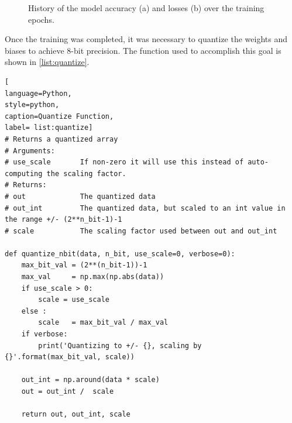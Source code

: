 \documentclass[11pt]{report}
\begin{document}
\begin{figure}[!ht]
     \centering
    \hfil

     \caption{History of the model accuracy (a) and losses (b) over the training epochs.}
    \label{fig:accuracy_over_epoch}
\end{figure}

Once the training was completed, it was necessary to quantize the weights and biases to achieve 8-bit precision. The function used to accomplish this goal is shown in \ref{list:quantize}.

\begin{lstlisting}[
language=Python,
style=python,
caption=Quantize Function,
label= list:quantize]
# Returns a quantized array
# Arguments:
# use_scale       If non-zero it will use this instead of auto-computing the scaling factor.
# Returns:
# out             The quantized data
# out_int         The quantized data, but scaled to an int value in the range +/- (2**n_bit-1)-1
# scale           The scaling factor used between out and out_int

def quantize_nbit(data, n_bit, use_scale=0, verbose=0):
    max_bit_val = (2**(n_bit-1))-1
    max_val     = np.max(np.abs(data))
    if use_scale > 0:
        scale = use_scale
    else :
        scale   = max_bit_val / max_val
    if verbose:
        print('Quantizing to +/- {}, scaling by {}'.format(max_bit_val, scale))

    out_int = np.around(data * scale)
    out = out_int /  scale

    return out, out_int, scale
\end{lstlisting}
\end{document}
